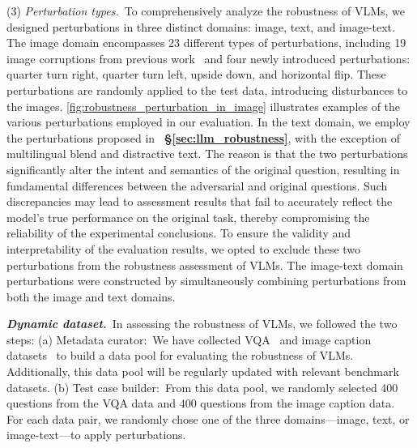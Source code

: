 (3) \textit{Perturbation types.}~To comprehensively analyze the robustness of VLMs, we designed perturbations in three distinct domains: image, text, and image-text. The image domain encompasses 23 different types of perturbations, including 19 image corruptions from previous work~\cite{hendrycks2019benchmarkingneuralnetworkrobustness} and four newly introduced perturbations: quarter turn right, quarter turn left, upside down, and horizontal flip. These perturbations are randomly applied to the test data, introducing disturbances to the images. \autoref{fig:robustness_perturbation_in_image} illustrates examples of the various perturbations employed in our evaluation. In the text domain, we employ the perturbations proposed in ~\textbf{\S\ref{sec:llm_robustness}}, with the exception of multilingual blend and distractive text. The reason is that the two perturbations significantly alter the intent and semantics of the original question, resulting in fundamental differences between the adversarial and original questions. Such discrepancies may lead to assessment results that fail to accurately reflect the model's true performance on the original task, thereby compromising the reliability of the experimental conclusions. To ensure the validity and interpretability of the evaluation results, we opted to exclude these two perturbations from the robustness assessment of VLMs. The image-text domain perturbations were constructed by simultaneously combining perturbations from both the image and text domains.



\textit{\textbf{Dynamic dataset.}}~In assessing the robustness of VLMs, we followed the two steps:
(a) Metadata curator:~We have collected VQA~\cite{goyal2017making} and image caption datasets~\cite{lin2014microsoft} to build a data pool for evaluating the robustness of VLMs. Additionally, this data pool will be regularly updated with relevant benchmark datasets.
(b) Test case builder:~From this data pool, we randomly selected 400 questions from the VQA data and 400 questions from the image caption data. For each data pair, we randomly chose one of the three domains—image, text, or image-text—to apply perturbations.




